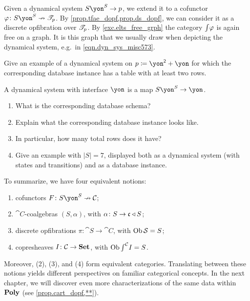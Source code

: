 \documentclass[Book-Poly]{subfiles}
\begin{document}
Given a dynamical system $S\yon^S\to p$, we extend it to a cofunctor $\varphi\colon S\yon^S\cof\cofree{p}$. By \cref{prop.tfae_dopf,prop.ds_dopf}, we can consider it as a discrete opfibration over $\mathscr{T}_{p}$. By \cref{exc.elts_free_grph} the category $\textstyle{\int} \varphi$ is again free on a graph. It is this graph that we usually draw when depicting the dynamical system, e.g.\ in \eqref{eqn.dyn_sys_misc573}.


\begin{exercise}
Give an example of a dynamical system on $p\coloneqq\yon^\2+\yon$ for which the corresponding database instance has a table with at least two rows.
\end{exercise}

\begin{exercise}
A dynamical system with interface $\yon$ is a map $S\yon^S\to\yon$.
\begin{enumerate}
	\item What is the corresponding database schema?
	\item Explain what the corresponding database instance looks like.
	\item In particular, how many total rows does it have?
	\item Give an example with $|S|=7$, displayed both as a dynamical system (with states and transitions) and as a database instance.	
\qedhere
\end{enumerate}
\end{exercise}

To summarize, we have four equivalent notions:
\begin{enumerate}[label=(\arabic*)]
    \item cofunctors $F\colon S\yon^S\cof\cat{C}$;
    \item $\cat{C}$-coalgebras $(S,\alpha)$, with $\alpha\colon S\to\mathfrak{c}\mathbin{\triangleleft} S$;
    \item discrete opfibrations $\pi\colon \cat{S}\to\cat{C}$, with $\operatorname{Ob}\mathcal{S}=S$;
    \item copresheaves $I\colon\mathcal{C}\to\mathbf{Set}$, with $\operatorname{Ob}\textstyle{\int}^{\mathcal{C}}I=S$.
\end{enumerate}
Moreover, (2), (3), and (4) form equivalent categories.
Translating between these notions yields different perspectives on familiar categorical concepts.
In the next chapter, we will discover even more characterizations of the same data within $\mathbf{Poly}$ (see \cref{prop.cart_dopf,**}).
\end{document}

